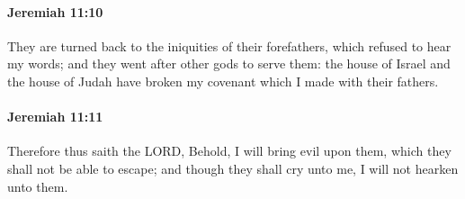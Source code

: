 		\paragraph{Jeremiah 11:10} %
			\label{JEREMIAH-11-10}

			They are turned back to the iniquities of their forefathers, which refused to hear my words; and they went after other gods to serve them: the house of Israel and the house of Judah have broken my covenant which I made with their fathers.


		\paragraph{Jeremiah 11:11} %
			\label{JEREMIAH-11-11}

			Therefore thus saith the LORD, Behold, I will bring evil upon them, which they shall not be able to escape; and though they shall cry unto me, I will not hearken unto them.

